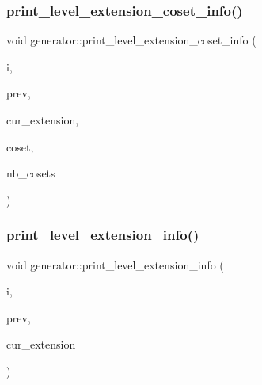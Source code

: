 \subsubsection{\texorpdfstring{print\+\_\+level\+\_\+extension\+\_\+coset\+\_\+info()}{print\_level\_extension\_coset\_info()}}
{\footnotesize\ttfamily void generator\+::print\+\_\+level\+\_\+extension\+\_\+coset\+\_\+info (\begin{DoxyParamCaption}\item[{\mbox{\hyperlink{galois_8h_a09fddde158a3a20bd2dcadb609de11dc}{I\+NT}}}]{i,  }\item[{\mbox{\hyperlink{galois_8h_a09fddde158a3a20bd2dcadb609de11dc}{I\+NT}}}]{prev,  }\item[{\mbox{\hyperlink{galois_8h_a09fddde158a3a20bd2dcadb609de11dc}{I\+NT}}}]{cur\+\_\+extension,  }\item[{\mbox{\hyperlink{galois_8h_a09fddde158a3a20bd2dcadb609de11dc}{I\+NT}}}]{coset,  }\item[{\mbox{\hyperlink{galois_8h_a09fddde158a3a20bd2dcadb609de11dc}{I\+NT}}}]{nb\+\_\+cosets }\end{DoxyParamCaption})}

\mbox{\label{classgenerator_aa771f96ac28c2c79e029e3d66b3b2942}} 
\subsubsection{\texorpdfstring{print\+\_\+level\+\_\+extension\+\_\+info()}{print\_level\_extension\_info()}}
{\footnotesize\ttfamily void generator\+::print\+\_\+level\+\_\+extension\+\_\+info (\begin{DoxyParamCaption}\item[{\mbox{\hyperlink{galois_8h_a09fddde158a3a20bd2dcadb609de11dc}{I\+NT}}}]{i,  }\item[{\mbox{\hyperlink{galois_8h_a09fddde158a3a20bd2dcadb609de11dc}{I\+NT}}}]{prev,  }\item[{\mbox{\hyperlink{galois_8h_a09fddde158a3a20bd2dcadb609de11dc}{I\+NT}}}]{cur\+\_\+extension }\end{DoxyParamCaption})}

\mbox{\label{classgenerator_aeef1b9fe6115b67be42d7cb3206fddd2}} 
